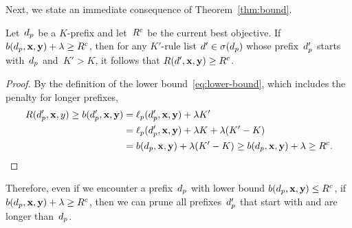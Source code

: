 %

Next, we state an immediate consequence of Theorem~\ref{thm:bound}.

\begin{lemma}
\label{lemma:lookahead}
Let~$d_p$ be a $K$-prefix
and let~${R^c}$ be the current best objective.
%
If ${b(d_p, \mathbf{x}, \mathbf{y}) + {\lambda} \ge {R^c}}$,
then for any $K'$-rule list ${{d}' \in \sigma(d_p)}$
whose prefix~$d_p'$ starts with~$d_p$ and~${K' > K}$,
it follows that ${R({d}', \mathbf{x}, \mathbf{y}) \ge {R^c}}$.
\end{lemma}

\begin{arxiv}
\begin{proof}
By the definition of the lower bound~\eqref{eq:lower-bound},
which includes the penalty for longer prefixes,
\begin{align}
R(d_p', \mathbf{x}, y) \ge b(d_p', \mathbf{x}, \mathbf{y}) &= \ell_p(d_p', \mathbf{x}, \mathbf{y}) + {\lambda} K' \nonumber \\
&= \ell_p(d_p', \mathbf{x}, \mathbf{y}) + {\lambda} K + {\lambda} (K' - K) \nonumber \\
&= b(d_p, \mathbf{x}, \mathbf{y}) + {\lambda} (K' - K)
\ge b(d_p, \mathbf{x}, \mathbf{y}) + {\lambda} \ge {R^c}.
\label{eq:lookahead}
\end{align}
\end{proof}
\end{arxiv}

Therefore, even if we encounter a prefix~$d_p$
with lower bound ${b(d_p, \mathbf{x}, \mathbf{y}) \le {R^c}}$,
if ${b(d_p, \mathbf{x}, \mathbf{y}) + {\lambda} \ge {R^c}}$, then we can prune
all prefixes~$d_p'$ that start with and are longer than~$d_p$.

